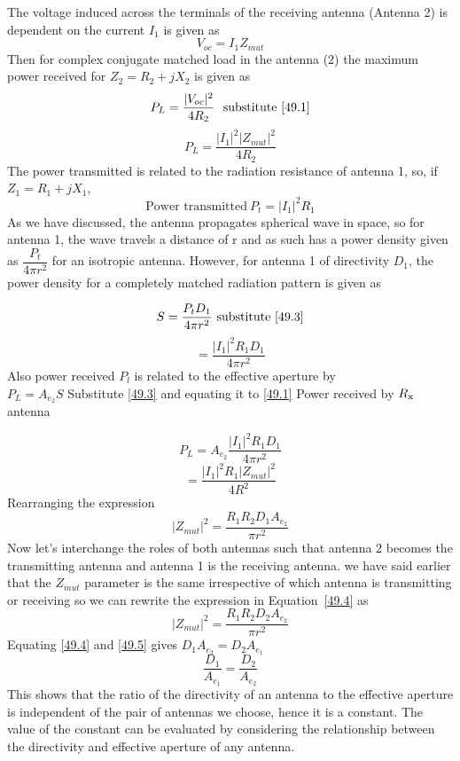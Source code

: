 The voltage induced across the terminals of the receiving antenna (Antenna 2) is dependent on the current $I_{1}$ is given as
\begin{equation}
\label{49.1}
V_{oc}= I_{1}Z_{mut}
\end{equation}
Then for complex conjugate matched load in the antenna (2) the maximum power received for $Z_{2} = R_{2}+jX_{2}$ is given as
$$P_{L}=\dfrac{|V_{oc}|^{2}}{4R_{2}}\
\text{\ substitute\  \ref{49.1}}$$
\begin{equation}
P_{L} = \dfrac{|I_{1}|^{2}|Z_{mut}|^{2}}{4R_{2}}
\end{equation}
The power transmitted is related to the radiation resistance of antenna 1, so, if $Z_{1}=R_{1}+jX_{1}$,
\begin{equation}
\label{49.3}
\text{Power transmitted}\ P_{t}=|I_{1}|^{2}R_{1}
\end{equation}
As we have discussed, the antenna propagates spherical wave in space, so for antenna 1, the wave travels a distance of r and as such has a power density given as $\dfrac{P_{t}}{4\pi r^{2}}$ for an isotropic antenna. However, for antenna 1 of directivity $D_{1}$, the power density for a completely matched radiation pattern is given as

$$ S=\dfrac{P_{t} D_{1}}{4\pi r^{2}}\ \text{substitute \ref{49.3}}$$
\begin{equation}
= \dfrac{|I_{1}|^{2}R_{1}D_{1}}{4\pi r^{2}}
\label{eqn17b}
\end{equation}
Also power received $P_{l}$ is related to the effective aperture by\\ 
$P_{L}= A_{e_{2}}S$ Substitute \ref{49.3} and equating it to \ref{49.1}\newline
Power received by $R_{\textnormal{x}}$ antenna

$$ P_{L} = A_{e_{2}}\dfrac{|I_{1}|^{2}R_{1}D_{1}}{4\pi r^{2}}$$
$$ = \dfrac{|I_{1}|^{2}R_{1}|Z_{mut}|^{2}}{4R^{2}}$$
Rearranging the expression 
\begin{equation}
\label{49.4}
|Z_{mut}|^{2}=\dfrac{R_{1}R_{2}D_{1}A_{e_{2}}}{\pi r^{2}}
\end{equation}
Now let's interchange the roles of both antennas such that antenna 2 becomes the transmitting antenna and antenna 1 is the receiving antenna. we have said earlier that the $Z_{mut}$ parameter is the same irrespective of which antenna is transmitting or receiving so we can rewrite the expression in Equation~\ref{49.4} as 
\begin{equation}
\label{49.5}
|Z_{mut}|^{2}=\dfrac{R_{1}R_{2}D_{2}A_{e_{2}}}{\pi r^{2}}
\end{equation}
Equating \ref{49.4} and \ref{49.5} gives $D_{1}A_{e_{2}}= D_{2}A_{e_{1}}$
\begin{equation}
\dfrac{D_{1}}{A_{e_{1}}}= \dfrac{D_{2}}{A_{e_{2}}}
\end{equation}
This shows that the ratio of the directivity of an antenna to the effective aperture is independent of the pair of antennas we choose, hence it is a constant. The value of the constant can be evaluated by considering the relationship between the directivity and effective aperture of any antenna.

